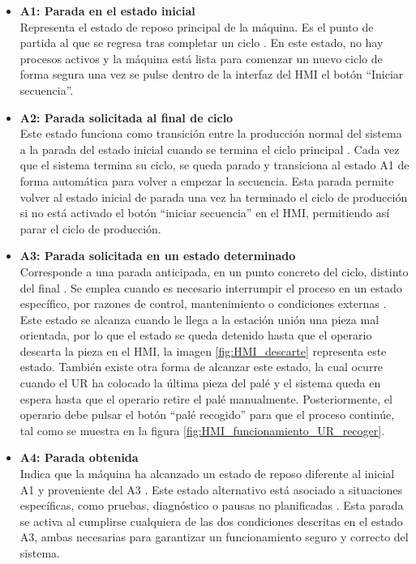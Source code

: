 \begin{itemize}
    \item \textbf{A1: Parada en el estado inicial} \\
    Representa el estado de reposo principal de la máquina. Es el punto de partida al que se regresa tras completar un ciclo \cite{guia_gemma}. En este estado, no hay procesos activos y la máquina está lista para comenzar un nuevo ciclo de forma segura una vez se pulse dentro de la interfaz del HMI el botón ``Iniciar secuencia''.

    \item \textbf{A2: Parada solicitada al final de ciclo} \\
    Este estado funciona como transición entre la producción normal del sistema a la parada del estado inicial cuando se termina el ciclo principal \cite{guia_gemma}. Cada vez que el sistema termina su ciclo, se queda parado y transiciona al estado A1 de forma automática para volver a empezar la secuencia. Esta parada permite volver al estado inicial de parada una vez ha terminado el ciclo de producción si no está activado el botón ``iniciar secuencia'' en el HMI, permitiendo así parar el ciclo de producción.
    
    \item \textbf{A3: Parada solicitada en un estado determinado} \\
    Corresponde a una parada anticipada, en un punto concreto del ciclo, distinto del final \cite{guia_gemma}. Se emplea cuando es necesario interrumpir el proceso en un estado específico, por razones de control, mantenimiento o condiciones externas \cite{guia_gemma}. Este estado se alcanza cuando le llega a la estación unión una pieza mal orientada, por lo que el estado se queda detenido hasta que el operario descarta la pieza en el HMI, la imagen \ref{fig:HMI_descarte} representa este estado. También existe otra forma de alcanzar este estado, la cual ocurre cuando el UR ha colocado la última pieza del palé y el sistema queda en espera hasta que el operario retire el palé manualmente. Posteriormente, el operario debe pulsar el botón “palé recogido” para que el proceso continúe, tal como se muestra en la figura \ref{fig:HMI_funcionamiento_UR_recoger}. \\

    \item \textbf{A4: Parada obtenida} \\
    Indica que la máquina ha alcanzado un estado de reposo diferente al inicial A1 y proveniente del A3 \cite{guia_gemma}. Este estado alternativo está asociado a situaciones específicas, como pruebas, diagnóstico o pausas no planificadas \cite{guia_gemma}. Esta parada se activa al cumplirse cualquiera de las dos condiciones descritas en el estado A3, ambas necesarias para garantizar un funcionamiento seguro y correcto del sistema.
    

\end{itemize}
